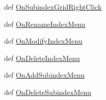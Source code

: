 \begin{CompactItemize}
\item 
def \hyperlink{classsubindextable_1_1EditingPanel_344f9900211cd9756fec6746d19fa8da}{On\-Subindex\-Grid\-Right\-Click}
\item 
def \hyperlink{classsubindextable_1_1EditingPanel_67682b6edb7711ee6374bf010631be1d}{On\-Rename\-Index\-Menu}
\item 
def \hyperlink{classsubindextable_1_1EditingPanel_795b4098297fac0d785299aa7de25cf5}{On\-Modify\-Index\-Menu}
\item 
def \hyperlink{classsubindextable_1_1EditingPanel_11add8224763f37383fabc67e0804bec}{On\-Delete\-Index\-Menu}
\item 
def \hyperlink{classsubindextable_1_1EditingPanel_6545422508739a2dd81fdc1d39ef83d5}{On\-Add\-Subindex\-Menu}
\item 
def \hyperlink{classsubindextable_1_1EditingPanel_fc1d34c2558da246e0574482344374d5}{On\-Delete\-Subindex\-Menu}
\end{CompactItemize}
